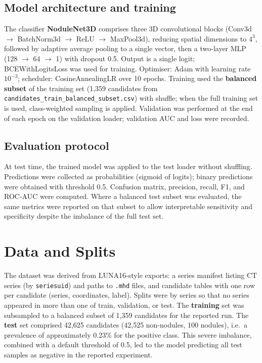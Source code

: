 \documentclass[11pt,a4paper]{article}
\begin{document}
\subsection{Model architecture and training}

The classifier \textbf{NoduleNet3D} comprises three 3D convolutional blocks (Conv3d $\to$ BatchNorm3d $\to$ ReLU $\to$ MaxPool3d), reducing spatial dimensions to $4^3$, followed by adaptive average pooling to a single vector, then a two-layer MLP (128 $\to$ 64 $\to$ 1) with dropout 0.5. Output is a single logit; BCEWithLogitsLoss was used for training. Optimiser: Adam with learning rate $10^{-3}$; scheduler: CosineAnnealingLR over 10 epochs. Training used the \textbf{balanced subset} of the training set (1,359 candidates from \texttt{candidates\_train\_balanced\_subset.csv}) with shuffle; when the full training set is used, class-weighted sampling is applied. Validation was performed at the end of each epoch on the validation loader; validation AUC and loss were recorded.

\subsection{Evaluation protocol}

At test time, the trained model was applied to the test loader without shuffling. Predictions were collected as probabilities (sigmoid of logits); binary predictions were obtained with threshold 0.5. Confusion matrix, precision, recall, F1, and ROC-AUC were computed. Where a balanced test subset was evaluated, the same metrics were reported on that subset to allow interpretable sensitivity and specificity despite the imbalance of the full test set.

\section{Data and Splits}

The dataset was derived from LUNA16-style exports: a series manifest listing CT series (by \texttt{seriesuid}) and paths to \texttt{.mhd} files, and candidate tables with one row per candidate (series, coordinates, label). Splits were by series so that no series appeared in more than one of train, validation, or test. The \textbf{training} set was subsampled to a balanced subset of 1,359 candidates for the reported run. The \textbf{test} set comprised 42,625 candidates (42,525 non-nodules, 100 nodules), i.e.\ a prevalence of approximately 0.23\% for the positive class. This severe imbalance, combined with a default threshold of 0.5, led to the model predicting all test samples as negative in the reported experiment.
\end{document}
